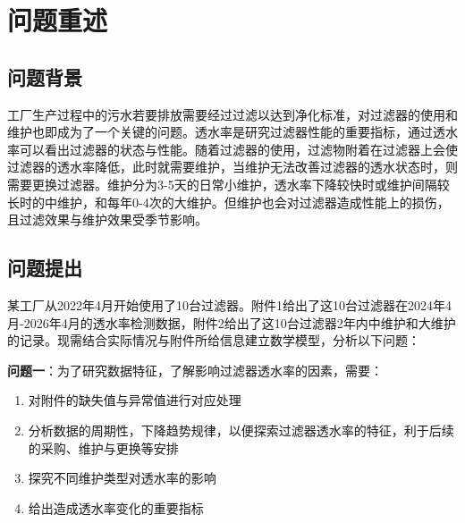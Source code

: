 \documentclass[withoutpreface,bwprint]{cumcmthesis}
\begin{document}
\begin{abstract}
\textbf{针对问题四}：考虑到在市场过滤器购买价格与维护成本会出现波动，需要改变相应参数进行优化策略的灵敏度分析。通过对两类成本分别施加 $\pm 10\%$ 和 $\pm 15\%$ 的扰动，并定义\textbf{损失率 $\delta$} 为固定原策略下的年均成本相对于新成本下重新优化所得年均成本的偏差比例，以衡量第三问所建策略在新成本环境下的表现。结果表明，所有情景下损失率绝对值均\textbf{不超过 3.34\%}，验证了建立的维护策略的合理性以及模型的普适性与稳定性。




\end{abstract}


\section{问题重述}
\subsection{问题背景}
\vspace{-5pt}工厂生产过程中的污水若要排放需要经过过滤以达到净化标准，对过滤器的使用和维护也即成为了一个关键的问题。透水率是研究过滤器性能的重要指标，通过透水率可以看出过滤器的状态与性能。随着过滤器的使用，过滤物附着在过滤器上会使过滤器的透水率降低，此时就需要维护，当维护无法改善过滤器的透水状态时，则需要更换过滤器。维护分为3-5天的日常小维护，透水率下降较快时或维护间隔较长时的中维护，和每年0-4次的大维护。但维护也会对过滤器造成性能上的损伤，且过滤效果与维护效果受季节影响。

\vspace{-13pt}\subsection{问题提出}

某工厂从2022年4月开始使用了10台过滤器。附件1给出了这10台过滤器在2024年4月-2026年4月的透水率检测数据，附件2给出了这10台过滤器2年内中维护和大维护的记录。现需结合实际情况与附件所给信息建立数学模型，分析以下问题：

\textbf{问题一}：为了研究数据特征，了解影响过滤器透水率的因素，需要：

\begin{enumerate}[label=\arabic*.,leftmargin=90pt]
	\item 对附件的缺失值与异常值进行对应处理
	\item 分析数据的周期性，下降趋势规律，以便探索过滤器透水率的特征，利于后续的采购、维护与更换等安排
	\item 探究不同维护类型对透水率的影响
	\item 给出造成透水率变化的重要指标
\end{enumerate}
\end{document}
